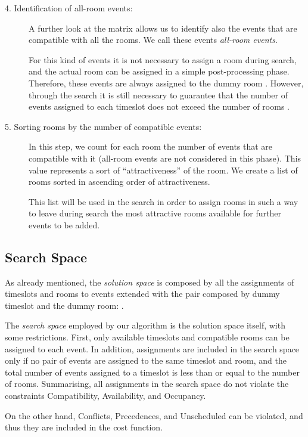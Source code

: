 \documentclass[authoryear,preprint,a4paper,12pt]{elsarticle}
\begin{document}
\begin{description}
\item[4. Identification of all-room events:] A further look at the  matrix allows us to
  identify also the events that are compatible with all the rooms. We call these events \emph{all-room events}.

  For this kind of events it is not necessary to assign a room during
  search, and the actual room can be assigned in a simple post-processing
  phase. Therefore, these events are always assigned to the dummy
  room . However, through the search it is still necessary to guarantee that
  the number of events assigned to each timeslot does not exceed the
  number of rooms . 

\item[5. Sorting rooms by the number of compatible events:] In this step, we
  count for each room the number of events that are compatible with it
  (all-room events are not considered in this phase).  This value
  represents a sort of ``attractiveness'' of the room.  We create a list of
  rooms sorted in ascending order of attractiveness.

  This list will be used in the search in order to assign rooms in
  such a way to leave during search the most attractive rooms
  available for further events to be added.
\end{description}

\subsection{Search Space}

As already mentioned, the \emph{solution space} is composed by all the
assignments of timeslots and rooms to events extended with the pair composed by dummy
timeslot and the dummy room: .

The \emph{search space} employed by our algorithm is the solution space itself, with some
restrictions.  First, only available timeslots and compatible rooms
can be assigned to each event. In addition, assignments are included
in the search space only if no pair of events are assigned to the same
timeslot and room, and the total number of events assigned to a
timeslot is less than or equal to the number of rooms.  Summarising, all
assignments in the search space do not violate the constraints
\textsf{Compatibility}, \textsf{Availability}, and \textsf{Occupancy}.

On the other hand, \textsf{Conflicts}, \textsf{Precedences}, and
\textsf{Unscheduled} can be violated, and thus they are included in
the cost function.
\end{document}
